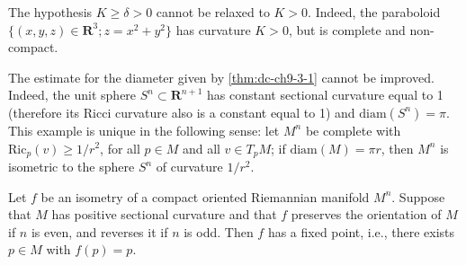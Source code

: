 \begin{remark}
  \label{rem:dc-ch9-3-4}
  The hypothesis $K\ge\delta>0$ cannot be relaxed to $K>0$. Indeed, the paraboloid
  $\{(x,y,z)\in\mathbf{R}^3;z=x^2+y^2\}$ has curvature $K>0$, but is complete and
  non-compact.
\end{remark}
\begin{remark}
  \label{rem:dc-ch9-3-6}
  The estimate for the diameter given by \cref{thm:dc-ch9-3-1} cannot be improved. Indeed, the
  unit sphere $S^n\subset\mathbf{R}^{n+1}$ has constant sectional curvature equal to
  1 (therefore its Ricci curvature also is a constant equal to 1) and
  $\mathrm{diam}(S^n)=\pi$. This example is unique in the following sense: let $M^n$
  be complete with $\mathrm{Ric}_p(v)\ge 1/r^2$, for all $p\in M$ and all $v\in T_pM$;
  if $\mathrm{diam}(M)=\pi r$, then $M^n$ is isometric to the sphere $S^n$ of
  curvature $1/r^2$.
\end{remark}
\begin{theorem}
  \label{thm:dc-ch9-3-7}
  Let $f$ be an isometry of a compact oriented Riemannian manifold $M^n$. Suppose
  that $M$ has positive sectional curvature and that $f$ preserves the orientation of
  $M$ if $n$ is even, and reverses it if $n$ is odd. Then $f$ has a fixed point, i.e.,
  there exists $p\in M$ with $f(p)=p$.
\end{theorem}

